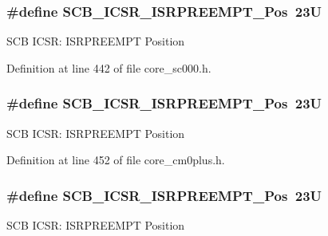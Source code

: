\subsubsection[{\texorpdfstring{S\+C\+B\+\_\+\+I\+C\+S\+R\+\_\+\+I\+S\+R\+P\+R\+E\+E\+M\+P\+T\+\_\+\+Pos}{SCB_ICSR_ISRPREEMPT_Pos}}]{\setlength{\rightskip}{0pt plus 5cm}\#define S\+C\+B\+\_\+\+I\+C\+S\+R\+\_\+\+I\+S\+R\+P\+R\+E\+E\+M\+P\+T\+\_\+\+Pos~23U}\hypertarget{group___c_m_s_i_s___s_c_b_ga11cb5b1f9ce167b81f31787a77e575df}{}\label{group___c_m_s_i_s___s_c_b_ga11cb5b1f9ce167b81f31787a77e575df}
S\+CB I\+C\+SR\+: I\+S\+R\+P\+R\+E\+E\+M\+PT Position 

Definition at line 442 of file core\+\_\+sc000.\+h.

\subsubsection[{\texorpdfstring{S\+C\+B\+\_\+\+I\+C\+S\+R\+\_\+\+I\+S\+R\+P\+R\+E\+E\+M\+P\+T\+\_\+\+Pos}{SCB_ICSR_ISRPREEMPT_Pos}}]{\setlength{\rightskip}{0pt plus 5cm}\#define S\+C\+B\+\_\+\+I\+C\+S\+R\+\_\+\+I\+S\+R\+P\+R\+E\+E\+M\+P\+T\+\_\+\+Pos~23U}\hypertarget{group___c_m_s_i_s___s_c_b_ga11cb5b1f9ce167b81f31787a77e575df}{}\label{group___c_m_s_i_s___s_c_b_ga11cb5b1f9ce167b81f31787a77e575df}
S\+CB I\+C\+SR\+: I\+S\+R\+P\+R\+E\+E\+M\+PT Position 

Definition at line 452 of file core\+\_\+cm0plus.\+h.

\subsubsection[{\texorpdfstring{S\+C\+B\+\_\+\+I\+C\+S\+R\+\_\+\+I\+S\+R\+P\+R\+E\+E\+M\+P\+T\+\_\+\+Pos}{SCB_ICSR_ISRPREEMPT_Pos}}]{\setlength{\rightskip}{0pt plus 5cm}\#define S\+C\+B\+\_\+\+I\+C\+S\+R\+\_\+\+I\+S\+R\+P\+R\+E\+E\+M\+P\+T\+\_\+\+Pos~23U}\hypertarget{group___c_m_s_i_s___s_c_b_ga11cb5b1f9ce167b81f31787a77e575df}{}\label{group___c_m_s_i_s___s_c_b_ga11cb5b1f9ce167b81f31787a77e575df}
S\+CB I\+C\+SR\+: I\+S\+R\+P\+R\+E\+E\+M\+PT Position 

